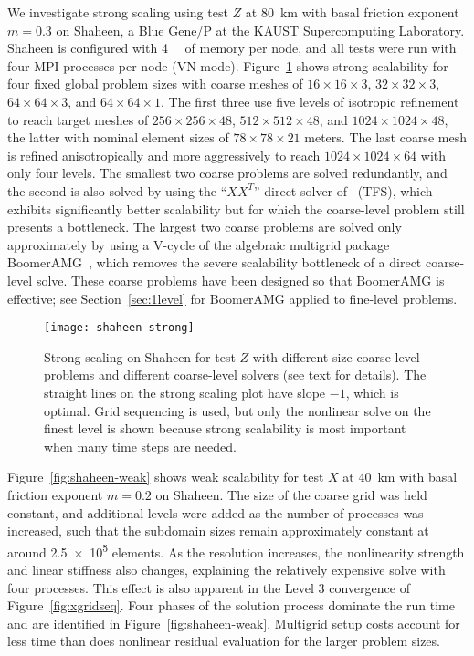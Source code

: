 We investigate strong scaling using test $Z$ at \SI{80}{\kilo\metre} with basal friction exponent $m= 0.3$ on Shaheen, a Blue Gene/P at the KAUST Supercomputing Laboratory.
Shaheen is configured with \SI{4}{\giga\byte} of memory per node, and all tests were run with four MPI processes per node (VN mode).
Figure~\ref{fig:shaheen-strong} shows strong scalability for four fixed global problem sizes with coarse meshes of $16\times 16\times 3$, $32\times 32\times 3$, $64\times 64\times 3$, and $64\times 64\times 1$.
The first three use five levels of isotropic refinement to reach target meshes of $256\times 256\times 48$, $512\times 512\times 48$, and $1024\times 1024\times 48$, the latter with nominal element sizes of $78\times 78\times 21$ meters.
The last coarse mesh is refined anisotropically and more aggressively to reach $1024\times 1024\times 64$ with only four levels.
The smallest two coarse problems are solved redundantly, and the second is also solved by using the ``$XX^T$'' direct solver of~\citet{tufo2001fast} (TFS), which exhibits significantly better scalability but for which the coarse-level problem still presents a bottleneck.
The largest two coarse problems are solved only approximately by using a V-cycle of the algebraic multigrid package BoomerAMG~\citep{henson2002bpa}, which removes the severe scalability bottleneck of a direct coarse-level solve.
These coarse problems have been designed so that BoomerAMG is effective; see Section~\ref{sec:1level} for BoomerAMG applied to fine-level problems.

\begin{figure}
  \centering\texttt{[image: shaheen-strong]}
  \caption{Strong scaling on Shaheen for test $Z$ with different-size coarse-level problems and different coarse-level solvers (see text for details).
    The straight lines on the strong scaling plot have slope $-1$, which is optimal.
    Grid sequencing is used, but only the nonlinear solve on the finest level is shown because strong scalability is most important when many time steps are needed.}\label{fig:shaheen-strong}
\end{figure}

Figure~\ref{fig:shaheen-weak} shows weak scalability for test $X$ at \SI{40}{\kilo\metre} with basal friction exponent $m=0.2$ on Shaheen.
The size of the coarse grid was held constant, and additional levels were added as the number of processes was increased, such that the subdomain sizes remain approximately constant at around \num{2.5e5} elements.
As the resolution increases, the nonlinearity strength and linear stiffness also changes, explaining the relatively expensive solve with four processes.
This effect is also apparent in the Level 3 convergence of Figure~\ref{fig:xgridseq}.
Four phases of the solution process dominate the run time and are identified in Figure~\ref{fig:shaheen-weak}.
Multigrid setup costs account for less time than does nonlinear residual evaluation for the larger problem sizes.

